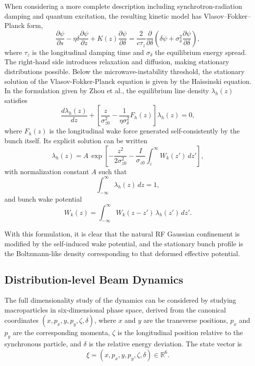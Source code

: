When considering a more complete description including synchrotron-radiation damping and quantum excitation, the resulting kinetic model has Vlasov--Fokker--Planck form,
\begin{equation}
    \frac{\partial \psi}{\partial s}-\eta\delta\frac{\partial \psi}{\partial z}+K(z)\frac{\partial \psi}{\partial \delta}
    =\frac{2}{c\tau_z}\frac{\partial}{\partial\delta}\left(\delta\psi+\sigma_\delta^2\frac{\partial\psi}{\partial\delta}\right),
    \label{eq:vfp_revised}
\end{equation}
where $\tau_z$ is the longitudinal damping time and $\sigma_\delta$ the equilibrium energy spread. The right-hand side introduces relaxation and diffusion, making stationary distributions possible.
Below the microwave-instability threshold, the stationary solution of the Vlasov-Fokker-Planck equation is given by the Ha\"issinski equation. In the formulation given by Zhou et al.\cite{zhou_theories_2023}, the equilibrium line density $\lambda_h(z)$ satisfies
\begin{equation}
\frac{d\lambda_h(z)}{dz}
+
\left[
\frac{z}{\sigma_{z0}^2}
-
\frac{1}{\eta\sigma_\delta^2}F_h(z)
\right]
\lambda_h(z)
=
0,
\label{eq:haissinski_diff}
\end{equation}
where $F_h(z)$ is the longitudinal wake force generated self-consistently by the bunch itself. Its explicit solution can be written
\begin{equation}
\lambda_h(z)
=
A\,
\exp\!\left[
-\frac{z^2}{2\sigma_{z0}^2}
-
\frac{I}{\sigma_{z0}}
\int_z^\infty W_k(z')\,dz'
\right],
\label{eq:haissinski_sol}
\end{equation}
with normalization constant $A$ such that
\begin{equation}
\int_{-\infty}^{\infty}\lambda_h(z)\,dz=1,
\end{equation}
and bunch wake potential
\begin{equation}
W_k(z)
=
\int_{-\infty}^{\infty}
W_k(z-z')\,\lambda_h(z')\,dz'.
\label{eq:wake_potential_self}
\end{equation}

With this formulation, it is clear that the natural RF Gaussian confinement is modified by the self-induced wake potential, and the stationary bunch profile is the Boltzmann-like density corresponding to that deformed effective potential.

\subsection{Distribution-level Beam Dynamics}
The full dimensionality study of the dynamics can be considered by studying macroparticles in six-dimensional phase space, derived from the canonical coordinates $(x,p_x,y,p_y,\zeta,\delta)$, where $x$ and $y$ are the transverse positions, $p_x$ and $p_y$ are the corresponding momenta, $\zeta$ is the longitudinal position relative to the synchronous particle, and $\delta$ is the relative energy deviation. The state vector is
\begin{equation}
    \xi=(x,p_x,y,p_y,\zeta,\delta)\in\mathbb{R}^{6}.
\end{equation}

